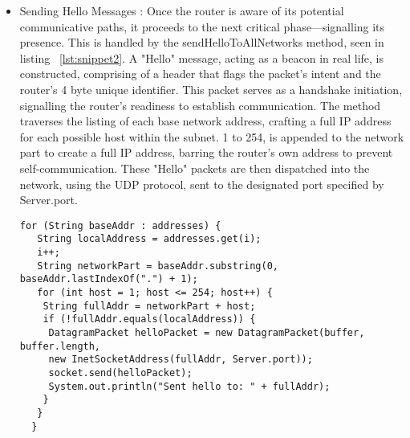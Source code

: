 \documentclass{article}
\begin{document}
\begin{itemize}
	\item Sending Hello Messages : Once the router is aware of its potential communicative paths, it proceeds to the next critical phase—signalling its presence. This is handled by the sendHelloToAllNetworks method, seen in listing ~\ref{lst:snippet2}. A "Hello" message, acting as a beacon in real life, is constructed, comprising of a header that flags the packet's intent and the router's 4 byte unique identifier. This packet serves as a handshake initiation, signalling the router's readiness to establish communication. The method traverses the listing of each base network address, crafting a full IP address for each possible host within the subnet. 1 to 254, is appended to the network part to create a full IP address, barring the router's own address to prevent self-communication. These "Hello" packets are then dispatched into the network, using the UDP protocol, sent to the designated port specified by Server.port. 

\begin{lstlisting}[caption={[code snippet 2]This snippet demonstrates how I implemented the hello protocol. I begin by traversing the list of each base network address, creating the full IP address for each possible host. 1-254 is added to the end of the network part - creating a full IP address. The routers own address is filtered out, to prevent self communication. Hello messages are then dispatched into the network }, label={lst:snippet2}]
for (String baseAddr : addresses) {
   String localAddress = addresses.get(i);
   i++;
   String networkPart = baseAddr.substring(0, baseAddr.lastIndexOf(".") + 1);
   for (int host = 1; host <= 254; host++) {
    String fullAddr = networkPart + host;
    if (!fullAddr.equals(localAddress)) {
     DatagramPacket helloPacket = new DatagramPacket(buffer, buffer.length,
     new InetSocketAddress(fullAddr, Server.port));
     socket.send(helloPacket);
     System.out.println("Sent hello to: " + fullAddr);
    }
   }
  }  
\end{lstlisting}


\end{itemize}
\end{document}
